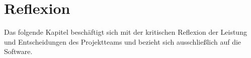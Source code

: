 %
%
%
%
%
%

\chapter{Reflexion}
Das folgende Kapitel beschäftigt sich mit der kritischen Reflexion der Leistung und Entscheidungen des Projektteams und bezieht sich ausschließlich auf die Software.\\

